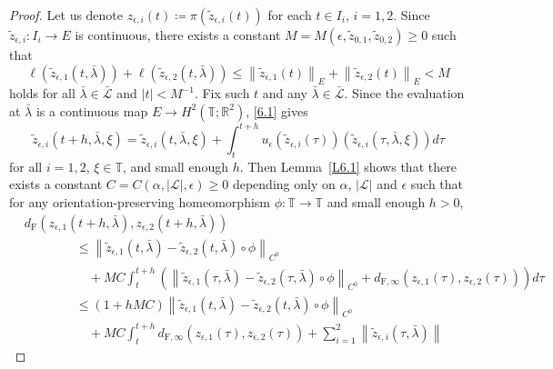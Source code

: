 \documentclass[reqno,centertags,12pt]{amsart}
\theoremstyle{definition}
\numberwithin{equation}{section}
\newcommand{\abs}[1]{\left\lvert#1\right\rvert}
\newcommand{\norm}[1]{\left\|#1\right\|}
\newcommand{\bbR}{{\mathbb{R}}}
\newcommand{\bbT}{{\mathbb{T}}}
\begin{document}
\begin{proof}
    Let us denote $z_{\epsilon,i}(t)\coloneqq\pi(\tilde{z}_{\epsilon,i}(t))$
    for each $t\in I_{i}$, $i=1,2$. Since $\tilde{z}_{\epsilon,i}\colon I_{i}\to E$ is
    continuous, there exists a constant $M=M(\epsilon,\tilde{z}_{0,1},\tilde{z}_{0,2})\geq 0$
    such that
    \[
        \ell(\tilde{z}_{\epsilon,1}(t,\bar{\lambda}))
        + \ell(\tilde{z}_{\epsilon,2}(t,\bar{\lambda}))
        \leq \norm{\tilde{z}_{\epsilon,1}(t)}_{E}
        + \norm{\tilde{z}_{\epsilon,2}(t)}_{E}
        < M
    \]
    holds for all $\bar{\lambda}\in\bar{\mathcal{L}}$ and $\abs{t}<M^{-1}$.
    Fix such $t$ and any $\bar{\lambda}\in\bar{\mathcal{L}}$.
    Since the evaluation at $\bar{\lambda}$ is a continuous map $E\to H^{2}(\bbT;\bbR^{2})$,
    \eqref{6.1} gives
    \[
        \tilde{z}_{\epsilon,i}(t+h,\bar{\lambda},\xi)
        = \tilde{z}_{\epsilon,i}(t,\bar{\lambda},\xi)
        + \int_{t}^{t+h}u_{\epsilon}(\tilde{z}_{\epsilon,i}(\tau))
        \left(\tilde{z}_{\epsilon,i}(\tau,\bar{\lambda},\xi)\right)d\tau
    \]
    for all $i=1,2$, $\xi\in\bbT$, and small enough $h$.
    Then Lemma~\ref{L6.1} shows that
    there exists a constant $C=C(\alpha,\abs{\mathcal{L}},\epsilon)\geq 0$
    depending only on $\alpha$, $\abs{\mathcal{L}}$ and $\epsilon$ such that
    for any orientation-preserving homeomorphism $\phi\colon\bbT\to\bbT$ and
    small enough $h>0$,
    \begin{align*}
        &d_{\mathrm{F}}\left(z_{\epsilon,1}(t+h,\bar{\lambda}),
        z_{\epsilon,2}(t+h,\bar{\lambda})\right) \\
        &\quad\quad\quad\quad \leq
        \norm{\tilde{z}_{\epsilon,1}(t,\bar{\lambda})
        - \tilde{z}_{\epsilon,2}(t,\bar{\lambda})\circ\phi}_{C^{0}}
        \\&\quad\quad\quad\quad\quad
        + MC\int_{t}^{t+h}
        \left(
            \norm{\tilde{z}_{\epsilon,1}(\tau,\bar{\lambda})
            - \tilde{z}_{\epsilon,2}(\tau,\bar{\lambda})\circ\phi}_{C^{0}}
            + d_{\mathrm{F},\infty}\left(z_{\epsilon,1}(\tau),
            z_{\epsilon,2}(\tau)\right)
        \right)
        d\tau \\
        &\quad\quad\quad\quad \leq
        (1 + hMC)
        \norm{\tilde{z}_{\epsilon,1}(t,\bar{\lambda})
        - \tilde{z}_{\epsilon,2}(t,\bar{\lambda})\circ\phi}_{C^{0}}
        \\&\quad\quad\quad\quad\quad
        + MC\int_{t}^{t+h}
        d_{\mathrm{F},\infty}(z_{\epsilon,1}(\tau),z_{\epsilon,2}(\tau))
        + \sum_{i=1}^{2}\norm{\tilde{z}_{\epsilon,i}(\tau,\bar{\lambda})
}
\end{align*}
\end{proof}
\end{document}
